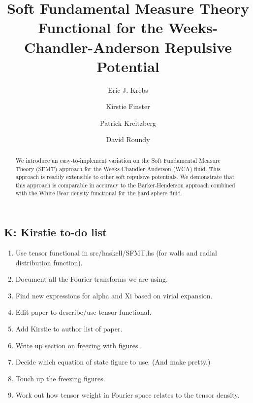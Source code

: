 \documentclass[letterpaper,twocolumn,amsmath,amssymb,prb]{revtex4-1}
\newcommand\kirstiesays[1]{{\bf \color{red}K: #1}}
\begin{document}
\title{Soft Fundamental Measure Theory Functional for the
  Weeks-Chandler-Anderson Repulsive Potential}

\author{Eric J. Krebs}

\author{Kirstie Finster}

\author{Patrick Kreitzberg}

\author{David Roundy}

\begin{abstract}
  We introduce an easy-to-implement variation on the Soft Fundamental
  Measure Theory (SFMT) approach for the Weeks-Chandler-Anderson (WCA)
  fluid.  This approach is readily extensible to other soft repulsive
  potentials.  We demonstrate that this approach is comparable in
  accuracy to the Barker-Henderson approach combined with the White
  Bear density functional for the hard-sphere fluid.
\end{abstract}

\maketitle

\subsection{\kirstiesays{Kirstie to-do list}}
\begin{enumerate}
\item Use tensor functional in src/haskell/SFMT.hs (for walls and
  radial distribution function).
\item Document all the Fourier transforms we are using.
\item Find new expressions for alpha and Xi based on virial expansion.
\item Edit paper to describe/use tensor functional.
\item Add Kirstie to author list of paper.
\item Write up section on freezing with figures.
\item Decide which equation of state figure to use. (And make pretty.)
\item Touch up the freezing figures.
\item Work out how tensor weight in Fourier space relates to the tensor density.
  
\end{enumerate}
\end{document}
